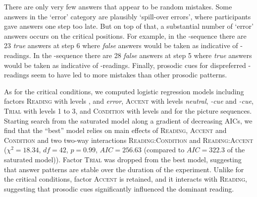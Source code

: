 \documentclass[fleqn,reqno,10pt]{article}
\newcommand{\lc}{\acro{lc}}
\newcommand{\ec}{\acro{ec}}
\begin{document}



There are only very few answers that appear to be random
mistakes. Some answers in the `error' category are plausibly
`spill-over errors', where participants gave answers one step too
late. But on top of that, a substantial number of `error' answers
occurs on the critical positions. For example, in the \lc-sequence
there are 23 \emph{true} answers at step 6 where \emph{false} answers
would be taken as indicative of \ec-readings. In the \ec-sequence
there are 28 \emph{false} answers at step 5 where \emph{true} answers
would be taken as indicative of \lc-readings. Finally, prosodic cues
for dispreferred \ec-readings seem to have led to more mistakes than
other prosodic patterns.

As for the critical conditions, we computed logistic regression models
including factors \textsc{Reading} with levels \lc, \ec and
\emph{error}, \textsc{Accent} with levels \emph{neutral},
\emph{\lc-cue} and \emph{\ec-cue}, \textsc{Trial} with levels 1 to
3, and \textsc{Condition} with levels \lc and \ec for the picture
sequences. Starting search from the saturated model along a gradient
of decreasing AICs, we find that the ``best'' model relies on main
effects of \textsc{Reading}, \textsc{Accent} and \textsc{Condition}
and two two-way interactions \textsc{Reading:Condition} and
\textsc{Reading:Accent} ($\chi^2=18.34$, $df=42$, $p=0.99$,
$AIC=256.63$ (compared to $AIC=322.3$ of the saturated model)). Factor
\textsc{Trial} was dropped from the best model, suggesting that
answer patterns are stable over the duration of the experiment. Unlike
for the critical conditions, factor \textsc{Accent} is retained, and
it interacts with \textsc{Reading}, suggesting that prosodic cues
significantly influenced the dominant reading.
\end{document}
